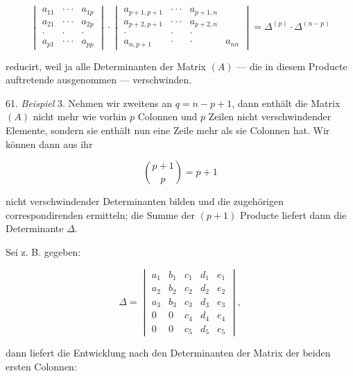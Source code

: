 \[
\begin{vmatrix}
a_{11} & \cdot\cdot\cdot & a_{1p} \\
a_{21} & \cdot\cdot\cdot & a_{2p} \\
\cdot & \cdot & \cdot \\
a_{p1} & \cdot\cdot\cdot & a_{pp}
\end{vmatrix}
\cdot
\begin{vmatrix}
a_{p+1,p+1} & \cdot\cdot\cdot & a_{p+1,n} \\
a_{p+2,p+1} & \cdot\cdot\cdot & a_{p+2,n} \\
\cdot & \cdot & \cdot \\
a_{n,p+1} & \cdot & \cdot & a_{nn}
\end{vmatrix}
= \Delta^{(p)} \cdot \Delta^{(n-p)}
\]

reducirt, weil ja alle Determinanten der Matrix $(A)$ --- die in diesem Producte auftretende
ausgenommen --- verschwinden.

61. \textit{Beispiel} 3. Nehmen wir zweitens an $q = n - p + 1$, dann enth\"alt die Matrix
$(A)$ nicht mehr wie vorhin $p$ Colonnen und $p$ Zeilen nicht verschwindender Elemente,
sondern sie enth\"alt nun eine Zeile mehr als sie Colonnen hat. Wir k\"onnen dann aus ihr

\[
\binom{p+1}{p} = p+1
\]

nicht verschwindender Determinanten bilden und die zugeh\"origen correspondirenden
ermitteln; die Summe der $(p+1)$ Producte liefert dann die Determinante $\Delta$.

Sei z. B. gegeben:

\[
\Delta = \begin{vmatrix}
a_1 & b_1 & c_1 & d_1 & e_1 \\
a_2 & b_2 & c_2 & d_2 & e_2 \\
a_3 & b_3 & c_3 & d_3 & e_3 \\
0 & 0 & c_4 & d_4 & e_4 \\
0 & 0 & c_5 & d_5 & e_5
\end{vmatrix},
\]


dann liefert die Entwicklung nach den Determinanten der Matrix der beiden ersten Colonnen:

